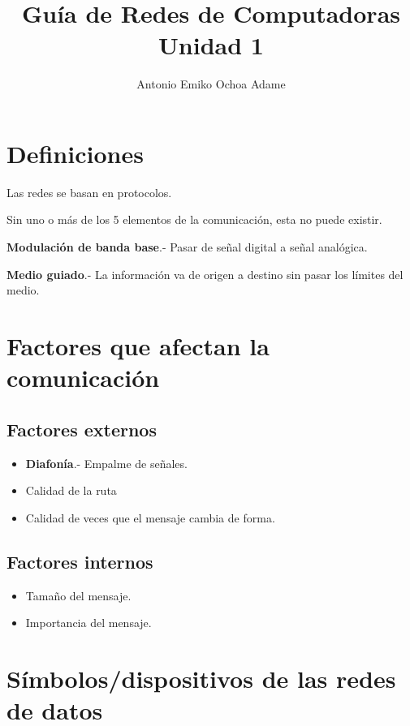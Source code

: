 \documentclass{article}
\begin{document}
\title{Guía de Redes de Computadoras Unidad 1}
\author{Antonio Emiko Ochoa Adame}
\maketitle

\section{Definiciones}

Las redes se basan en protocolos.

Sin uno o más de los 5 elementos de la comunicación, esta no puede existir.

\textbf{Modulación de banda base}.- Pasar de señal digital a señal analógica.

\textbf{Medio guiado}.- La información va de origen a destino sin pasar los
límites del medio.

\section{Factores que afectan la comunicación}

\subsection{Factores externos}

\begin{itemize}
	\item
	\textbf{Diafonía}.- Empalme de señales.
	\item
	Calidad de la ruta
	\item
	Calidad de veces que el mensaje cambia de forma.
\end{itemize}

\subsection{Factores internos}

\begin{itemize}
	\item
	Tamaño del mensaje.
	\item
	Importancia del mensaje.
\end{itemize}

\section{Símbolos/dispositivos de las redes de datos}
\end{document}
